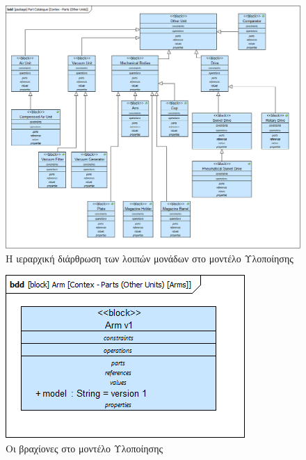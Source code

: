 \documentclass[a4paper,12pt,twoside]{report}
\begin{document}
\begin{appendices}
				\begin{figure}[hp]
					\centering
					\includegraphics[scale=0.30]{DesignModel_Contex-Parts(OtherUnits).png}
					\caption{Η ιεραρχική διάρθρωση των λοιπών μονάδων στο μοντέλο Υλοποίησης}
					\label{φωτ:Η ιεραρχική διάρθρωσητων λοιπών μονάδων στο μοντέλο Υλοποίησης}
				\end{figure}
				
				\begin{figure}[hp]
					\centering
					\includegraphics[scale=0.50]{DesignModel_Contex-Parts(OtherUnits)[Arms].png}
					\caption{Οι βραχίονες στο μοντέλο Υλοποίησης}
					\label{φωτ:Οι βραχίονες στο μοντέλο Υλοποίησης}
				\end{figure}
				

\end{appendices}
\end{document}
